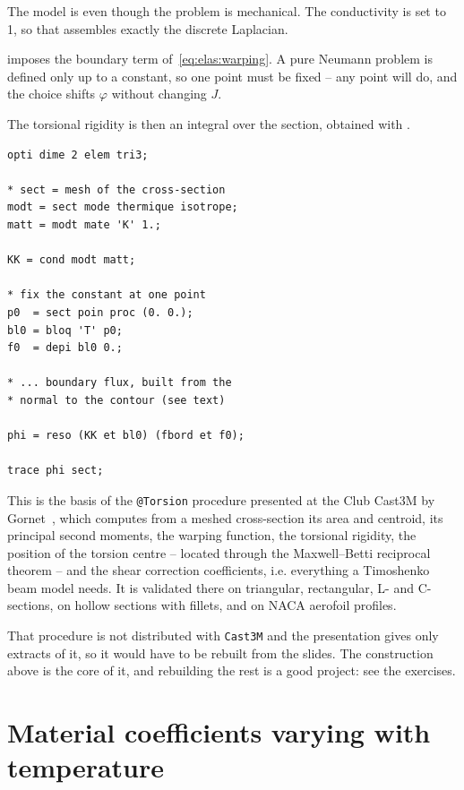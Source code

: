 \begin{castemcom}
The model is  even though the problem is mechanical. The
conductivity is set to 1, so that  assembles exactly the discrete
Laplacian.

 imposes the boundary term of~\eqref{eq:elas:warping}. A pure
Neumann problem is defined only up to a constant, so one point must be fixed
-- any point will do, and the choice shifts $\varphi$ without changing $J$.

The torsional rigidity is then an integral over the section, obtained with
 .
\end{castemcom}
\begin{castemlines}
\begin{verbatim}
opti dime 2 elem tri3;

* sect = mesh of the cross-section
modt = sect mode thermique isotrope;
matt = modt mate 'K' 1.;

KK = cond modt matt;

* fix the constant at one point
p0  = sect poin proc (0. 0.);
bl0 = bloq 'T' p0;
f0  = depi bl0 0.;

* ... boundary flux, built from the
* normal to the contour (see text)

phi = reso (KK et bl0) (fbord et f0);

trace phi sect;
\end{verbatim}
\end{castemlines}

%
\noindent This is the basis of the \texttt{@Torsion} procedure presented at
the Club Cast3M by Gornet~\cite{Gornet:club2017}, which computes from a
meshed cross-section its area and centroid, its principal second moments, the
warping function, the torsional rigidity, the position of the torsion centre
-- located through the Maxwell--Betti reciprocal theorem -- and the shear
correction coefficients, i.e. everything a Timoshenko beam model needs. It is
validated there on triangular, rectangular, L- and C-sections, on hollow
sections with fillets, and on NACA aerofoil profiles.

That procedure is not distributed with \texttt{Cast3M} and the presentation
gives only extracts of it, so it would have to be rebuilt from the slides.
The construction above is the core of it, and rebuilding the rest is a good
project: see the exercises.

\section{Material coefficients varying with temperature}

